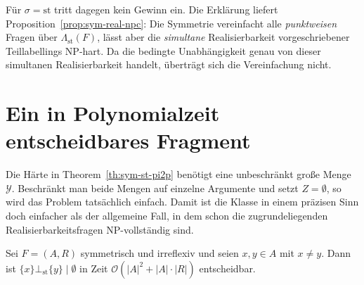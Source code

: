 Für \(\sigma=\mathrm{st}\) tritt dagegen kein Gewinn ein. Die Erklärung liefert
Proposition~\ref{prop:sym-real-npc}: Die Symmetrie vereinfacht alle
\emph{punktweisen} Fragen über \(\Lambda_{\mathrm{st}}(F)\), lässt aber die
\emph{simultane} Realisierbarkeit vorgeschriebener Teillabellings NP-hart. Da
die bedingte Unabhängigkeit genau von dieser simultanen Realisierbarkeit
handelt, überträgt sich die Vereinfachung nicht.

\section{Ein in Polynomialzeit entscheidbares Fragment}
\label{sec:sym-fragment}

Die Härte in Theorem~\ref{th:sym-st-pi2p} benötigt eine unbeschränkt große
Menge \(\mathcal{Y}\). Beschränkt man beide Mengen auf einzelne Argumente und
setzt \(Z=\emptyset\), so wird das Problem tatsächlich einfach. Damit ist die
Klasse in einem präzisen Sinn doch einfacher als der allgemeine Fall, in dem
schon die zugrundeliegenden Realisierbarkeitsfragen NP-vollständig sind.

\begin{Proposition}
    \label{prop:sym-singleton-p}
    Sei \(F=(A,R)\) symmetrisch und irreflexiv und seien \(x,y\in A\) mit
    \(x\neq y\). Dann ist \(\{x\}\bot_{\mathrm{st}}\{y\}\mid\emptyset\) in Zeit
    \(\mathcal{O}(|A|^2+|A|\cdot|R|)\) entscheidbar.
\end{Proposition}

